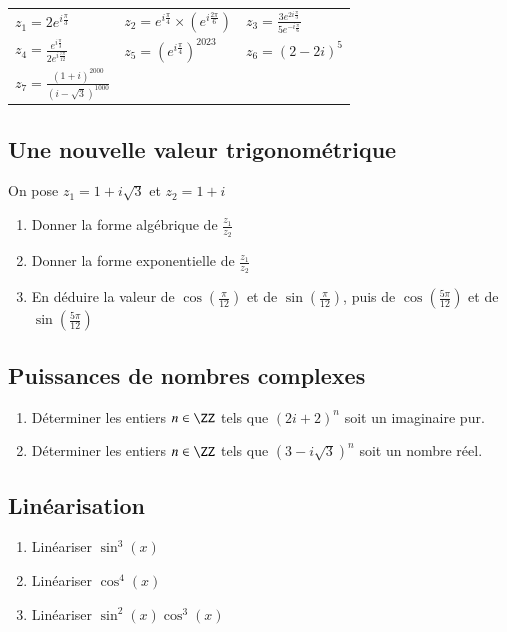 \documentclass[oneside,12pt]{article}          %
\begin{document}
\begin{tabular}{p{} p{} p{}}
    $z_1=2e^{i\frac{\pi}{3}}$ & $z_2=e^{i\frac{\pi}{4}}\times (e^{i\frac{2\pi}{6}})$ & $z_3=\frac{3e^{2i\frac{\pi}{3}}}{5e^{-i\frac{\pi}{6}}}$ \\
    $z_4=\frac{e^{i\frac{\pi}{3}}}{2e^{i\frac{7\pi}{12}}}$ & $z_5=\left(e^{i\frac{\pi}{4}}\right)^{2023}$ & $z_6 = (2-2i)^5$ \\
    $z_7=\frac{(1+i)^{2000}}{(i-\sqrt{3})^{1000}}$
\end{tabular}



\subsection{Une nouvelle valeur trigonométrique}
On pose $z_1=1+i\sqrt{3}$ et $z_2=1+i$
\begin{enumerate}
    \item Donner la forme algébrique de $\frac{z_1}{z_2}$
    \item Donner la forme exponentielle de $\frac{z_1}{z_2}$
    \item En déduire la valeur de $\cos(\frac{\pi}{12})$ et de $\sin(\frac{\pi}{12})$, puis de $\cos(\frac{5\pi}{12})$ et de $\sin(\frac{5\pi}{12})$
\end{enumerate}



\subsection{Puissances de nombres complexes}
\begin{enumerate}
    \item Déterminer les entiers $n\in\ZZ$ tels que $(2i+2)^n$ soit un imaginaire pur.
	\item Déterminer les entiers $n\in\ZZ$ tels que $(3-i\sqrt{3})^n$ soit un nombre réel.
\end{enumerate}



\subsection{Linéarisation}
\begin{enumerate}
	\item Linéariser $\sin^3(x)$
	\item Linéariser $\cos^4(x)$
	\item Linéariser $\sin^2(x)\cos^3(x)$
\end{enumerate}
\end{document}
